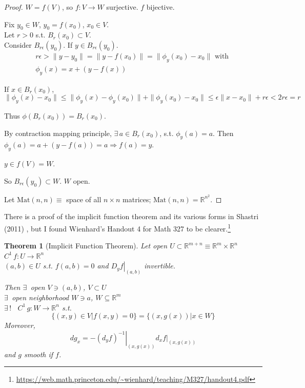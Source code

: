 \documentclass[10pt]{amsart}
\newtheorem{theorem}{Theorem}
\begin{document}
\begin{multicols*}{2}
\begin{proof}
$W=f(V)$, so $f:V\to W$ surjective.  $f$ bijective.  

Fix $y_0 \in W$, $y_0 = f(x_0)$, $x_0 \in V$.  \\
Let $r>0$ s.t. $B_r(x_0) \subset V$.  \\
Consider $B_{r\epsilon}(y_0)$.  If $y\in B_{r\epsilon}(y_0)$.  
\[
\begin{gathered}
  r\epsilon > \| y-y_0 \| = \| y - f(x_0) \| = \| \phi_y(x_0) - x_0 \| \text{ with } \\
  \phi_y(x) = x + (y-f(x))
\end{gathered}
\]

If $x\in B_r(x_0)$, 
\[
\| \phi_y(x) -x_0 \| \leq \| \phi_y(x) - \phi_y(x_0) \|  + \| \phi_y(x_0) - x_0 \| \leq \epsilon \| x-x_0 \| + r\epsilon < 2 r\epsilon = r
\]


Thus $\phi(B_r(x_0)) = B_r(x_0)$.

By contraction mapping principle, $\exists \, a \in B_r(x_0)$, s.t. $\phi_y(a)=a$.  Then $\phi_y(a) = a+ (y-f(a)) = a \Longrightarrow f(a) =y$.  

$y\in f(V) = W$.  

So $B_{r\epsilon}(y_0) \subset W$.  $W$ open.  

Let $\text{Mat}(n,n) \equiv $ space of all $n\times n$ matrices; $\text{Mat}(n,n)  = \mathbb{R}^{n^2}$.  


\end{proof}

There is a proof of the implicit function theorem and its various forms in Shastri (2011) \cite{AShastri2011}, but I found Wienhard's Handout 4 for Math 327 to be clearer.\footnote{\url{https://web.math.princeton.edu/~wienhard/teaching/M327/handout4.pdf}}

\begin{theorem}[Implicit Function Theorem]
Let open $U \subset \mathbb{R}^{m+n} \equiv \mathbb{R}^m \times \mathbb{R}^n$  \\
\phantom{Let} $C^1 \, f:U \to \mathbb{R}^n $ \\
\phantom{Let} $(a,b) \in U$ s.t. $f(a,b) = 0$ and $\left. D_y f\right|_{(a,b)}$ invertible.  

Then $\exists \, $ open $V \ni (a,b)$, $V \subset U$ \\
\phantom{Then} $\exists \, $ open neighborhood $W \ni a$, $W \subseteq \mathbb{R}^m$ \\
\phantom{Then} $\exists \, !$ \, $C^1 \, g:W \to \mathbb{R}^n$ s.t.
\[
\lbrace (x,y) \in V | f(x,y) =0 \rbrace = \lbrace (x,g(x)) | x \in W \rbrace
\]
Moreover,
\[
dg_x = - \left. (d_yf)^{-1} \right|_{(x,g(x))} \left. d_x f\right|_{(x,g(x))}
\]
and $g$ smooth if $f$.  
\end{theorem}


\end{multicols*}
\end{document}
